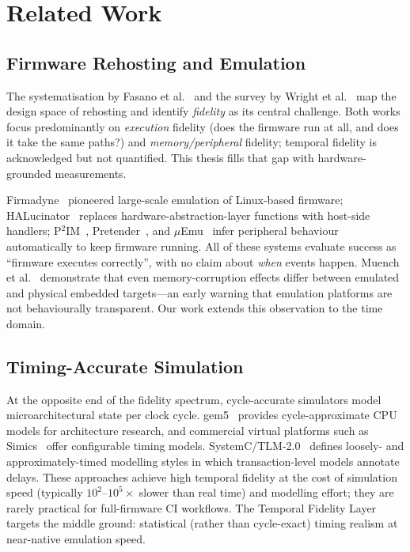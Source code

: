 \chapter{Related Work}
\label{ch:relatedwork}

\section{Firmware Rehosting and Emulation}
\label{sec:rw:rehosting}

The systematisation by Fasano et al.~\cite{fasano2021sok} and the
survey by Wright et al.~\cite{wright2021challenges} map the design
space of rehosting and identify \emph{fidelity} as its central
challenge. Both works focus predominantly on \emph{execution} fidelity
(does the firmware run at all, and does it take the same paths?) and
\emph{memory/peripheral} fidelity; temporal fidelity is acknowledged
but not quantified. This thesis fills that gap with hardware-grounded
measurements.

Firmadyne~\cite{chen2016firmadyne} pioneered large-scale emulation of
Linux-based firmware; HALucinator~\cite{clements2020halucinator}
replaces hardware-abstraction-layer functions with host-side handlers;
P$^2$IM~\cite{feng2020p2im}, Pretender~\cite{gustafson2019pretender},
and $\mu$Emu~\cite{zhou2021uemu} infer peripheral behaviour
automatically to keep firmware running. All of these systems evaluate
success as ``firmware executes correctly'', with no claim about
\emph{when} events happen. Muench et al.~\cite{muench2018you}
demonstrate that even memory-corruption effects differ between
emulated and physical embedded targets---an early warning that
emulation platforms are not behaviourally transparent. Our work extends
this observation to the time domain.

\section{Timing-Accurate Simulation}
\label{sec:rw:timing}

At the opposite end of the fidelity spectrum, cycle-accurate simulators
model microarchitectural state per clock cycle. gem5~\cite{binkert2011gem5}
provides cycle-approximate CPU models for architecture research, and
commercial virtual platforms such as Simics~\cite{magnusson2002simics}
offer configurable timing models. SystemC/TLM-2.0~\cite{systemc} defines
loosely- and approximately-timed modelling styles in which
transaction-level models annotate delays. These approaches achieve high
temporal fidelity at the cost of simulation speed (typically
$10^2$--$10^5\times$ slower than real time) and modelling effort; they
are rarely practical for full-firmware CI workflows. The Temporal
Fidelity Layer targets the middle ground: statistical (rather than
cycle-exact) timing realism at near-native emulation speed.

